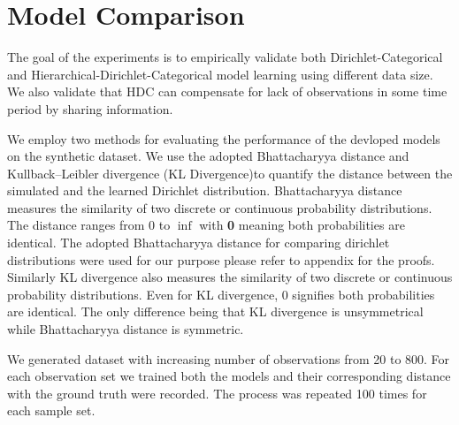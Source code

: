 \section{Model Comparison}

The goal of the experiments is to empirically validate both Dirichlet-Categorical and Hierarchical-Dirichlet-Categorical model 
learning using different data size. We also validate that HDC can compensate  for lack of observations in some time period by sharing information.

We employ two methods for evaluating the performance of the devloped models on the synthetic dataset. We use the adopted Bhattacharyya distance \cite{bhattacharyya1946measure} and Kullback–Leibler divergence \cite{kullback1951information} (KL Divergence)to quantify the distance between the simulated and the learned Dirichlet distribution.   Bhattacharyya distance measures the similarity of two discrete or continuous probability distributions. The distance ranges from 0 to $\inf$ with \textbf{0} meaning both probabilities are identical. The  adopted Bhattacharyya distance \cite{rauber2008bhattacharyya} for comparing dirichlet distributions were used for our purpose please refer to appendix for the proofs. Similarly KL divergence also measures the similarity of two discrete or continuous probability distributions. Even for KL divergence, 0 signifies both probabilities are identical.  The only difference being that KL divergence is unsymmetrical while Bhattacharyya distance is symmetric. 

We generated dataset with increasing number of observations from 20 to 800. For each observation set we trained both the models and their corresponding distance with the ground truth were recorded. The process was repeated 100 times for each sample set.

